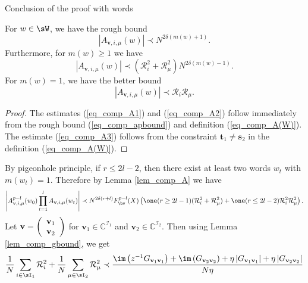 \begin{subsection}{Conclusion of the proof with words}
\begin{lemma}\label{lem_comp_A}
  For $w\in\sW$, we have the rough bound
  \begin{equation}
  |A_{\mathbf v, i, \mu}(w)|\prec N^{2\delta(m(w)+1)}.\label{eq_comp_A1}
  \end{equation}
  Furthermore, for $m(w)\ge 1$ we have
  \begin{equation}
  |A_{\mathbf v, i, \mu}(w)|\prec(\mathcal R_i^2+\mathcal R_\mu^2)N^{2\delta(m(w)-1)}.\label{eq_comp_A2}
  \end{equation}
  For $m(w)=1$, we have the better bound
  \begin{equation}
  |A_{\mathbf v, i, \mu}(w)|\prec \mathcal R_i\mathcal R_\mu.\label{eq_comp_A3}
  \end{equation}
\end{lemma}
\begin{proof}
The estimates (\ref{eq_comp_A1}) and (\ref{eq_comp_A2}) follow immediately from the rough bound (\ref{eq_comp_apbound}) and definition (\ref{eq_comp_A(W)}).  
The estimate (\ref{eq_comp_A3}) follows from the constraint $\mathbf t_1\ne\mathbf s_2$ in the definition (\ref{eq_comp_A(W)}).
\end{proof}
By pigeonhole principle, if $r\le 2l-2$, then there exist at least two words $w_t$ with $m(w_t)=1$. Therefore by Lemma \ref{lem_comp_A} we have
\begin{equation}\label{eq_comp_r1}
 \left|A^{p-l}_{\mathbf v, i, \mu}(w_0)\prod_{t=1}^{l}A_{\mathbf v, i, \mu}(w_t)\right|\prec N^{2\delta(r+l)}F_{\bv}^{p-l}(X)\left(\one(r\ge 2l-1)(\mathcal R_i^2+\mathcal R_\mu^2)+\one(r\le 2l-2)\mathcal R_i^2\mathcal R_\mu^2\right).
\end{equation}
Let $\mathbf v=\left( {\begin{array}{*{20}c}
   {\mathbf v}_1   \\
   {\mathbf v}_2 \\
   \end{array}} \right)$ for ${\mathbf v}_1 \in\mathbb C^{\mathcal I_1}$ and ${\mathbf v}_2\in\mathbb C^{\mathcal I_2}$. Then using Lemma \ref{lem_comp_gbound}, we get
\begin{align}
 \frac{1}{N}\sum_{i\in\sI_1}\mathcal R_i^2+ \frac{1}{N}\sum_{\mu\in\sI_2}\mathcal R_{\mu}^2 & \prec\frac{\im \left(z^{-1}G_{\mathbf v_1\mathbf v_1}\right) + \im \left(G_{\mathbf v_2\mathbf v_2}\right) +\eta \left|G_{\mathbf v_1\mathbf v_1}\right|+\eta \left|G_{\mathbf v_2\mathbf v_2}\right|}{N\eta} \nonumber\\

\end{align}
\end{subsection}
